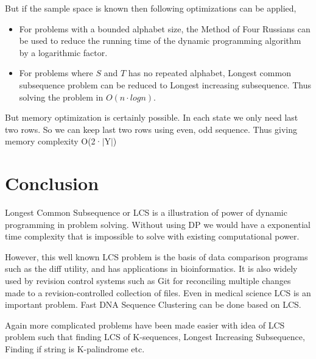 \documentclass{report}
\begin{document}
    \bigskip
    But if the sample space is known then following optimizations can be applied,
    \begin{itemize}
        \item For problems with a bounded alphabet size, the Method of Four Russians can be used to reduce the running time of the dynamic programming algorithm by a logarithmic factor.
        \item For problems where $S$ and $T$ has no repeated alphabet, Longest common subsequence problem can be reduced to Longest increasing subsequence. Thus solving the problem in $O(n\cdot logn)$.
    \end{itemize}
    \bigskip
    But memory optimization is certainly possible. In each state we
    only need last two rows. So we can keep last two rows using even,
    odd sequence. Thus giving memory complexity O(2·$|$Y$|$)
    
    \chapter{Conclusion}
    Longest Common Subsequence or LCS is a illustration of power of dynamic programming in problem solving. Without using DP we would have a exponential time complexity that is impossible to solve with existing computational power.
    
    \bigskip
    However, this well known LCS problem is the basis of data comparison programs such as the diff utility, and has applications in bioinformatics. It is also widely used by revision control systems such as Git for reconciling multiple changes made to a revision-controlled collection of files. Even in medical science LCS is an important problem. Fast DNA Sequence Clustering can be done based on LCS.  
    
    Again more complicated problems have been made easier with idea of LCS problem such that finding LCS of K-sequences, Longest Increasing Subsequence, Finding if string is K-palindrome etc.
    
    
\end{document}
